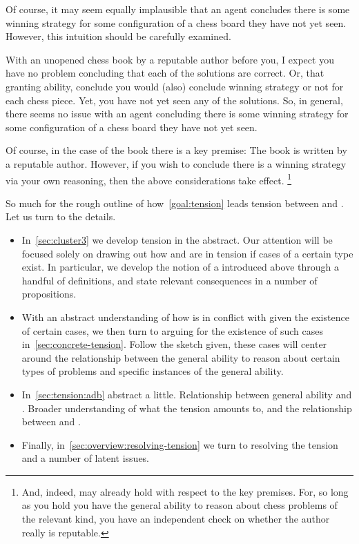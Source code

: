 \begin{note}[Ability]
  Of course, it may seem equally implausible that an agent concludes there is some winning strategy for some configuration of a chess board they have not yet seen.
  However, this intuition should be carefully examined.

  With an unopened chess book by a reputable author before you, I expect you have no problem concluding that each of the solutions are correct.
  {
    \color{red}
    Or, that granting ability, conclude you would (also) conclude winning strategy or not for each chess piece.
  }
  Yet, you have not yet seen any of the solutions.
  So, in general, there seems no issue with an agent concluding there is some winning strategy for some configuration of a chess board they have not yet seen.

  Of course, in the case of the book there is a key premise:
  The book is written by a reputable author.
  However, if you wish to conclude there is a winning strategy via your own reasoning, then the above considerations take effect.%
  \footnote{
    And, indeed, may already hold with respect to the key premises.
    For, so long as you hold you have the general ability to reason about chess problems of the relevant kind, you have an independent check on whether the author really is reputable.
  }
\end{note}

\begin{note}[Moving on]
  So much for the rough outline of how~\autoref{goal:tension} leads tension between \csN{} and \ESU{}.
  Let us turn to the details.

  {
    \color{red}
    \begin{itemize}
    \item
      In~\autoref{sec:cluster3} we develop tension in the abstract.
      Our attention will be focused solely on drawing out how \csN{} and \ESU{} are in tension if cases of a certain type exist.
      In particular, we develop the notion of a \cluster{} introduced above through a handful of definitions, and state relevant consequences in a number of propositions.
    \item
      With an abstract understanding of how \csN{} is in conflict with \ESU{} given the existence of certain cases, we then turn to arguing for the existence of such cases in~\autoref{sec:concrete-tension}.
      Follow the sketch given, these cases will center around the relationship between the general ability to reason about certain types of problems and specific instances of the general ability.
    \item
      In~\autoref{sec:tension:adb} abstract a little.
      Relationship between general ability and .
      Broader understanding of what the tension amounts to, and the relationship between \EAS{} and \adB{}.
    \item
      Finally, in~\autoref{sec:overview:resolving-tension} we turn to resolving the tension and a number of latent issues.
    \end{itemize}
  }
\end{note}

